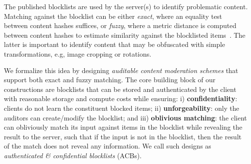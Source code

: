 The published blocklists are used by the server(s) to identify problematic content. Matching against the blocklist can be either \emph{exact}, where an equality test between content hashes suffices, or \emph{fuzzy}, where a metric
distance is computed between content hashes to estimate similarity against the blocklisted items~\cite{yang2025certphash}. The latter is important to identify content that may be obfuscated with simple transformations, e.g, image cropping or rotations. 



We formalize this idea by designing \emph{auditable content moderation schemes} that support both exact and fuzzy matching.  The core building block of our constructions are blocklists that can be stored and authenticated by the client with reasonable storage and compute costs while ensuring: i) \textbf{confidentiality}: clients do not learn the constituent blocked items; ii) \textbf{unforgeability}: only the auditors can create/modify the blocklist; and iii) \textbf{oblivious matching}: the client can obliviously match its input against items in the blocklist while revealing the result to the server, such that if the input is not in the blocklist, then the result of the match does not reveal any information. We call such designs as \emph{authenticated \& confidential blocklists} (ACBs). 

